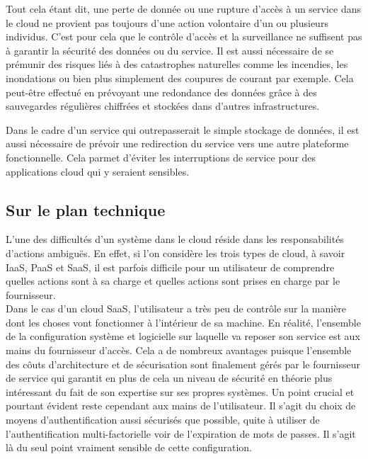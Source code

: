 \documentclass[a4paper, 12pt]{article}
\begin{document}
      Tout cela étant dit, une perte de donnée ou une rupture d'accès à un
      service dans le cloud ne provient pas toujours d'une action volontaire
      d'un ou plusieurs individus. C'est pour cela que le contrôle d'accès et la
      surveillance ne suffisent pas à garantir la sécurité des données ou
      du service. Il est aussi nécessaire de se prémunir des risques liés à des
      catastrophes naturelles comme les incendies, les inondations ou bien plus
      simplement des coupures de courant par exemple. Cela peut-être
      effectué en prévoyant une redondance des données grâce à des sauvegardes
      régulières chiffrées et stockées dans d'autres infrastructures.

      Dans le cadre d'un service qui outrepasserait le simple stockage de
      données, il est aussi nécessaire de prévoir une redirection du service
      vers une autre plateforme fonctionnelle. Cela parmet d'éviter les
      interruptions de service pour des applications cloud qui y seraient
      sensibles.

    \subsection{Sur le plan technique}
      L'une des difficultés d'un système dans le cloud réside dans les
      responsabilités d'actions ambiguës. En effet, si l'on considère les
      trois types de cloud, à savoir IaaS, PaaS et SaaS, il est parfois
      difficile pour un utilisateur de comprendre quelles actions sont à
      sa charge et quelles actions sont prises en charge par le fournisseur. \\

      Dans le cas d'un cloud SaaS, l'utilisateur a très peu de contrôle sur
      la manière dont les choses vont fonctionner à l'intérieur de sa machine.
      En réalité, l'ensemble de la configuration système et logicielle sur
      laquelle va reposer son service est aux mains du fournisseur d'accès.
      Cela a de nombreux avantages puisque l'ensemble des côuts d'architecture
      et de sécurisation sont finalement gérés par le fournisseur de service qui
      garantit en plus de cela un niveau de sécurité en théorie plus
      intéressant du fait de son expertise sur ses propres systèmes. Un point
      crucial et pourtant évident reste cependant aux mains de l'utilisateur.
      Il s'agit du choix de moyens d'authentification aussi sécurisés que
      possible, quite à utiliser de l'authentification multi-factorielle voir
      de l'expiration de mots de passes. Il s'agit là du seul point vraiment
      sensible de cette configuration. \\
\end{document}
